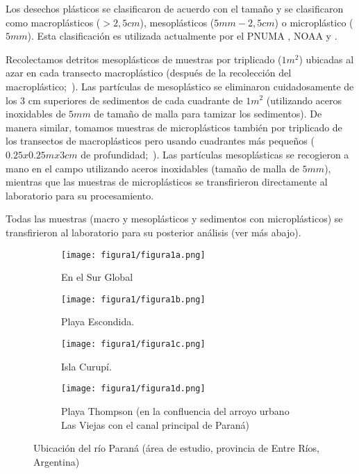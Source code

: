 Los desechos plásticos se clasificaron de acuerdo con el tamaño y se clasificaron como macroplásticos ($>2,5cm$), mesoplásticos ($5mm-2,5cm$) o microplástico ($5mm$). Esta clasificación es utilizada actualmente por el PNUMA \parencite{Cheshire2009}, NOAA \parencite{lippiatt2013marine} y \cite{msfd2013guidance}.

Recolectamos detritos mesoplásticos de muestras por triplicado ($1m^{2}$) ubicadas al azar en cada transecto macroplástico (después de la recolección del macroplástico;~\cite{lippiatt2013marine}). Las partículas de mesoplástico se eliminaron cuidadosamente de los 3 cm superiores de sedimentos de cada cuadrante de $1m^{2}$ (utilizando aceros inoxidables de $5mm$ de tamaño de malla para tamizar los sedimentos). De manera similar, tomamos muestras de microplásticos también por triplicado de los transectos de macroplásticos pero usando cuadrantes más pequeños ($0.25 x 0.25m x 3cm$ de profundidad;~\cite{Klein2015}). Las partículas mesoplásticas se recogieron a mano en el campo utilizando aceros inoxidables (tamaño de malla de $5mm$), mientras que las muestras de microplásticos se transfirieron directamente al laboratorio para su procesamiento.

Todas las muestras (macro y mesoplásticos y sedimentos con microplásticos) se transfirieron al laboratorio para su posterior análisis (ver más abajo).

\begin{figure}[t]
	\centering
	\begin{subfigure}[b]{0.45\linewidth}
		\texttt{[image: figura1/figura1a.png]}
		\caption{En el Sur Global}
		\label{fig:sur_global}
	\end{subfigure}
	\begin{subfigure}[b]{0.45\linewidth}
		\texttt{[image: figura1/figura1b.png]}
		\caption{Playa Escondida.}
		\label{fig:playa_escondida}
	\end{subfigure}
	\begin{subfigure}[b]{0.45\linewidth}
		\texttt{[image: figura1/figura1c.png]}
		\caption{Isla Curupí.}
		\label{fig:isla_curupi}
	\end{subfigure}
	\begin{subfigure}[b]{0.45\linewidth}
		\texttt{[image: figura1/figura1d.png]}
		\caption{\tiny Playa Thompson (en la confluencia del arroyo urbano Las Viejas con el canal principal de Paraná)}
		\label{fig:playa_thompson}
	\end{subfigure}
	\caption{Ubicación del río Paraná (área de estudio, provincia de Entre Ríos, Argentina)}
	\label{fig:ubicacion_rioParana}
	\vspace{-7mm}
\end{figure}

